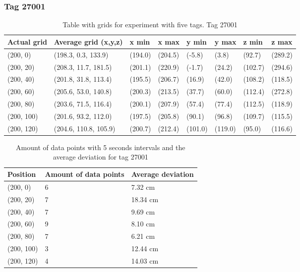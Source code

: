 \subsubsection{Tag 27001}
\begin{table}[H] 
    \centering
    \begin{tabular}{|l|l|l|l|l|l|l|l|}
    \hline
Actual grid & Average grid (x,y,z)   & x min   & x max   & y min    & y max   & z min   & z max    \\ \hline
(200, 0) 	& (198.3, 0.3, 133.9) 	 & (194.0) 	& (204.5)	& (-5.8)	 & (3.8) 	 & (92.7)	 & (289.2)	\\ \hline
(200, 20) 	& (208.3, 11.7, 181.5) 	 & (201.1) 	& (220.9)	& (-1.7)	 & (24.2) 	 & (102.7)	 & (294.6)	\\ \hline
(200, 40) 	& (201.8, 31.8, 113.4) 	 & (195.5) 	& (206.7)	& (16.9)	 & (42.0) 	 & (108.2)	 & (118.5)	\\ \hline
(200, 60) 	& (205.6, 53.0, 140.8) 	 & (200.3) 	& (213.5)	& (37.7)	 & (60.0) 	 & (112.4)	 & (272.8)	\\ \hline
(200, 80) 	& (203.6, 71.5, 116.4) 	 & (200.1) 	& (207.9)	& (57.4)	 & (77.4) 	 & (112.5)	 & (118.9)	\\ \hline
(200, 100) 	& (201.6, 93.2, 112.0) 	 & (197.5) 	& (205.8)	& (90.1)	 & (96.8) 	 & (109.7)	 & (115.5)	\\ \hline
(200, 120) 	& (204.6, 110.8, 105.9)  & (200.7) 	& (212.4)	& (101.0)	 & (119.0) 	 & (95.0)	 & (116.6)	\\ \hline
\end{tabular}
\caption{Table with grids for experiment with five tags. Tag 27001}
\end{table}

\begin{table}[H]
    \centering
    \begin{tabular}{|l|l|l|}
    \hline
    Position   & Amount of data points & Average deviation \\ \hline
    (200, 0)   & 6                     & 7.32 cm                  \\ \hline
    (200, 20)  & 7                     & 18.34 cm                  \\ \hline
    (200, 40)  & 7                     & 9.69 cm                  \\ \hline
    (200, 60)  & 9                     & 8.10 cm                  \\ \hline
    (200, 80)  & 7                     & 6.21 cm                  \\ \hline
    (200, 100) & 3                     & 12.44 cm                  \\ \hline
    (200, 120) & 4                     & 14.03 cm                  \\ \hline
    \end{tabular}
    \caption{Amount of data points with 5 seconds intervals and the average deviation for tag 27001}
\end{table}

